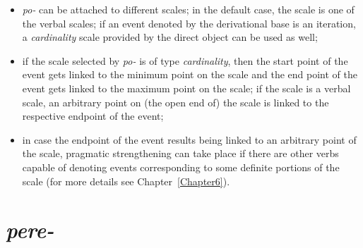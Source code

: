 \begin{itemize}
\item \textit{po-} can be attached to different scales; in the default case, the scale is one of the verbal scales; if an event denoted by the derivational base is an iteration, a \textit{cardinality} scale provided by the direct object can be used as well;
\item if the scale selected by \textit{po-} is of type \textit{cardinality}, then the start point of the event gets linked to the minimum point on the scale and the end point of the event gets linked to the maximum point on the scale; if the scale is a verbal scale, an arbitrary point on (the open end of) the scale is linked to the respective endpoint of the event;
\item in case the endpoint of the event results being linked to an arbitrary point of the scale, pragmatic strengthening can take place if there are other verbs capable of denoting events corresponding to some definite portions of the scale (for more details see Chapter~\ref{Chapter6}).
\end{itemize}



\section{\textit{pere-}}\label{subsection:semantics:pere}

